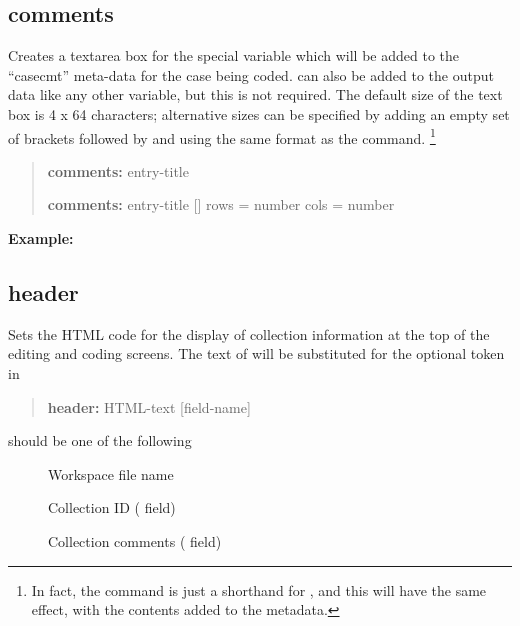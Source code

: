 \documentclass[letterpaper,10pt,english]{sphinxmanual}
\begin{document}
\subsection{comments}
\label{forms:comments}
Creates a textarea box for the special variable  which will be
added to the “casecmt” meta-data for the case being coded. 
can also be added to the output data like any other variable, but this
is not required. The default size of the text box is 4 x 64 characters;
alternative sizes can be specified by adding an empty set of brackets
followed by  and  using the same format as the 
command. \footnote{
In fact, the  command is just a shorthand for
, and this will have the same
effect, with the contents added to the metadata.
}
\begin{quote}

\begin{DUlineblock}{0em}
\item[] \textbf{comments:} entry-title
\item[] \textbf{comments:} entry-title {[}{]} rows = number cols = number
\end{DUlineblock}
\end{quote}

\textbf{Example:}
\begin{quote}

\end{quote}


\subsection{header}
\label{forms:header}
Sets the HTML code for the display of collection information at the
top of the editing and coding screens. The text of  will
be substituted for the optional token  in 
\begin{quote}

\begin{DUlineblock}{0em}
\item[] \textbf{header:} HTML-text {[}field-name{]}
\end{DUlineblock}
\end{quote}

 should be one of the following
\begin{description}
\item[{}] \leavevmode
Workspace file name

\item[{}] \leavevmode
Collection ID ( field)

\item[{}] \leavevmode
Collection comments ( field)

\end{description}
\end{document}
